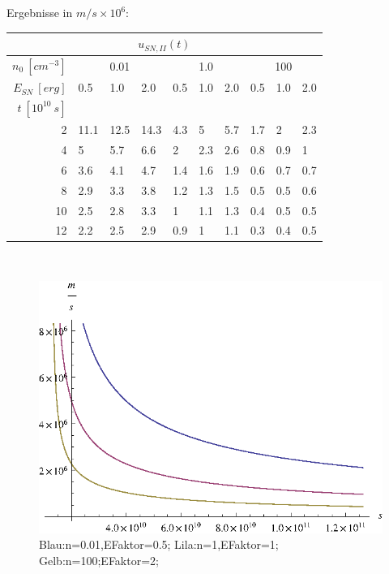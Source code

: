 \newpage
Ergebnisse in $m/s \times 10^{6}$:
\begin{center}
\begin{tabular}{|r|l|l|l|l|l|l|l|l|l|}
\multicolumn{10}{c}{\(u_{SN,II}(t)\)}\\
\hline
\(n_0~[cm^{-3}]\) & \multicolumn{3}{|c|}{0.01} & \multicolumn{3}{|c|}{1.0} & \multicolumn{3}{|c|}{100}\\
\hline
\(E_{SN}~[erg]\) & 0.5 & 1.0 & 2.0 & 0.5 & 1.0 & 2.0 & 0.5 & 1.0 & 2.0\\
\hline
\(t~[10^{10}~s]\) & & & & & & & & & \\
\cline{1-1}
2 & 11.1 & 12.5 & 14.3 &
4.3 & 5 & 5.7 &
1.7 & 2 & 2.3 \\

4 & 5 & 5.7 & 6.6 &
2 & 2.3 & 2.6 &
0.8 & 0.9 & 1 \\

6 & 3.6 & 4.1 & 4.7 &
1.4 & 1.6 & 1.9 &
0.6 & 0.7 & 0.7 \\

8 & 2.9 & 3.3 & 3.8 &
1.2 & 1.3 & 1.5 &
0.5 & 0.5 & 0.6 \\

10 & 2.5 & 2.8 & 3.3 &
1 & 1.1 & 1.3 &
0.4 & 0.5 & 0.5 \\

12 & 2.2 & 2.5 & 2.9 &
0.9 & 1 & 1.1 &
0.3 & 0.4 & 0.5 \\
\hline
\end{tabular}\\
\end{center}
\begin{figure}[ht]
\begin{center}
\includegraphics{aufgabe6u.eps}
\end{center}
\caption[Bildunterschrift]{Blau:n=0.01,EFaktor=0.5; Lila:n=1,EFaktor=1; Gelb:n=100;EFaktor=2;}
\end{figure}
